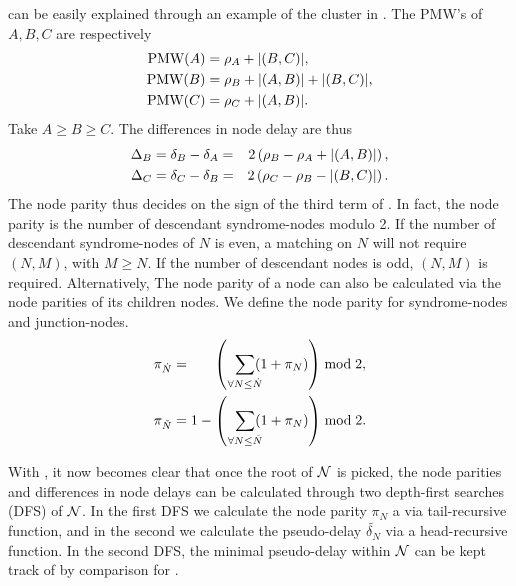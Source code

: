  can be easily explained through an example of the cluster in . The PMW's of $A, B, C$ are respectively 
\begin{align}
    \nonumber \text{PMW}(A) &= \rho_A + \lvert(B, C)\rvert, \\
    \nonumber \text{PMW}(B) &= \rho_B + \lvert(A, B)\rvert + \lvert(B, C)\rvert, \\
    \nonumber \text{PMW}(C) &= \rho_C + \lvert(A, B)\rvert.
\end{align}
Take $A\geq B\geq C$. The differences in node delay are thus 
\begin{align}
    \nonumber \Delta_B &= \delta_B - \delta_A =& 2\left(\rho_B - \rho_A + \lvert(A, B)\rvert\right), \\
    \nonumber \Delta_C &= \delta_C - \delta_B =& 2\left(\rho_C - \rho_B - \lvert(B, C)\rvert\right).
\end{align}
The node parity thus decides on the sign of the third term of . In fact, the node parity is the number of descendant syndrome-nodes modulo 2. If the number of descendant syndrome-nodes of $N$ is even, a matching on $N$ will not require $(N,M)$, with $M\geq N$. If the number of descendant nodes is odd, $(N,M)$ is required. Alternatively, The node parity of a node can also be calculated via the node parities of its children nodes. We define the node parity for syndrome-nodes and junction-nodes. 
\begin{align}
    \pi_{\dot{N}} &= \hspace{.6cm}\left(\hspace{.2cm} \sum_{\mathclap{\forall N \leq \dot{N}}} (1+\pi_N) \right ) \bmod 2, \label{eq:snodeparity}\\
    \pi_{\check{N}} &= 1 - \left(\hspace{.2cm} \sum_{\mathclap{\forall N \leq \check{N}}} (1+\pi_N) \right) \bmod 2. \label{eq:jnodeparity}
\end{align}

With , it now becomes clear that once the root of $\mathcal{N}$ is picked, the node parities and differences in node delays can be calculated through two depth-first searches (DFS) of $\mathcal{N}$. In the first DFS we calculate the node parity $\pi_N$ a via tail-recursive function, and in the second we calculate the pseudo-delay $\tilde{\delta_N}$ via a head-recursive function. In the second DFS, the minimal pseudo-delay within $\mathcal{N}$ can be kept track of by comparison for . 

